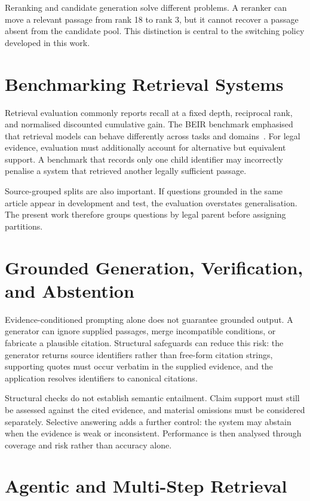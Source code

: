 Reranking and candidate generation solve different problems. A reranker can move a relevant passage from rank 18 to rank 3, but it cannot recover a passage absent from the candidate pool. This distinction is central to the switching policy developed in this work.

\section{Benchmarking Retrieval Systems}

Retrieval evaluation commonly reports recall at a fixed depth, reciprocal rank, and normalised discounted cumulative gain. The BEIR benchmark emphasised that retrieval models can behave differently across tasks and domains~\cite{thakur2021beir}. For legal evidence, evaluation must additionally account for alternative but equivalent support. A benchmark that records only one child identifier may incorrectly penalise a system that retrieved another legally sufficient passage.

Source-grouped splits are also important. If questions grounded in the same article appear in development and test, the evaluation overstates generalisation. The present work therefore groups questions by legal parent before assigning partitions.

\section{Grounded Generation, Verification, and Abstention}

Evidence-conditioned prompting alone does not guarantee grounded output. A generator can ignore supplied passages, merge incompatible conditions, or fabricate a plausible citation. Structural safeguards can reduce this risk: the generator returns source identifiers rather than free-form citation strings, supporting quotes must occur verbatim in the supplied evidence, and the application resolves identifiers to canonical citations.

Structural checks do not establish semantic entailment. Claim support must still be assessed against the cited evidence, and material omissions must be considered separately. Selective answering adds a further control: the system may abstain when the evidence is weak or inconsistent. Performance is then analysed through coverage and risk rather than accuracy alone.

\section{Agentic and Multi-Step Retrieval}

